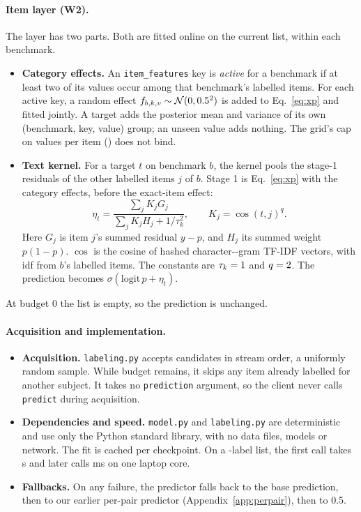 \documentclass{article}
\begin{document}
\paragraph{Item layer (W2).} The layer has two parts. Both are fitted online on the current list, within each benchmark.
\begin{itemize}
\item \textbf{Category effects.} An \texttt{item\_features} key is \emph{active} for a benchmark if at least two of its values occur among that benchmark's labelled items. For each active key, a random effect $f_{b,k,v}\sim\mathcal N(0,0.5^2)$ is added to Eq.~\ref{eq:xp} and fitted jointly. A target adds the posterior mean and variance of its own (benchmark, key, value) group; an unseen value adds nothing. The grid's cap on values per item (\WtFeatShare) does not bind.
\item \textbf{Text kernel.} For a target $t$ on benchmark $b$, the kernel pools the stage-1 residuals of the other labelled items $j$ of $b$. Stage 1 is Eq.~\ref{eq:xp} with the category effects, before the exact-item effect:
\begin{equation}
\eta_t=\frac{\sum_j K_j G_j}{\sum_j K_j H_j + 1/\tau_k^2},\qquad K_j=\cos(t,j)^{q}.
\label{eq:kernel}
\end{equation}
Here $G_j$ is item $j$'s summed residual $y-p$, and $H_j$ its summed weight $p(1-p)$. $\cos$ is the cosine of hashed character-\WtGramN-gram TF-IDF vectors, with idf from $b$'s labelled items. The constants are $\tau_k=1$ and $q=2$. The prediction becomes $\sigma(\mathrm{logit}\,p+\eta_t)$.
\end{itemize}
At budget 0 the list is empty, so the prediction is unchanged.

\paragraph{Acquisition and implementation.}
\begin{itemize}
\item \textbf{Acquisition.} \texttt{labeling.py} accepts candidates in stream order, a uniformly random sample. While budget remains, it skips any item already labelled for another subject. It takes no \texttt{prediction} argument, so the client never calls \texttt{predict} during acquisition.
\item \textbf{Dependencies and speed.} \texttt{model.py} and \texttt{labeling.py} are deterministic and use only the Python standard library, with no data files, models or network. The fit is cached per checkpoint. On a \CkSelBigEntries-label list, the first call takes \WkBigFit{} s and later calls \WkBigMs{} ms on one laptop core.
\item \textbf{Fallbacks.} On any failure, the predictor falls back to the base prediction, then to our earlier per-pair predictor (Appendix~\ref{app:perpair}), then to 0.5.
\end{itemize}
\end{document}
